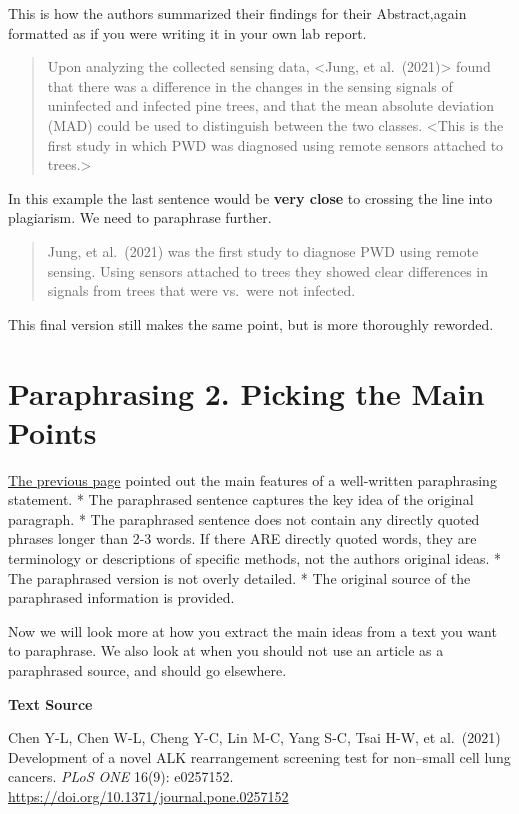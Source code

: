 \documentclass[
]{book}
\begin{document}
This is how the authors summarized their findings for their Abstract,again formatted as if you were writing it in your own lab report.

\begin{quote}
Upon analyzing the collected sensing data, \textless Jung, et al.~(2021)\textgreater{} found that there was a difference in the changes in the sensing signals of uninfected and infected pine trees, and that the mean absolute deviation (MAD) could be used to distinguish between the two classes. \textless This is the first study in which PWD was diagnosed using remote sensors attached to trees.\textgreater{}
\end{quote}

In this example the last sentence would be \textbf{very close} to crossing the line into plagiarism. We need to paraphrase further.

\begin{quote}
Jung, et al.~(2021) was the first study to diagnose PWD using remote sensing. Using sensors attached to trees they showed clear differences in signals from trees that were vs.~were not infected.
\end{quote}

This final version still makes the same point, but is more thoroughly reworded.

\hypertarget{paraphrasingtwo507}{%
\chapter{Paraphrasing 2. Picking the Main Points}\label{paraphrasingtwo507}}

\protect\hyperlink{paraphrasingone506}{The previous page} pointed out the main features of a well-written paraphrasing statement.
* The paraphrased sentence captures the key idea of the original paragraph.
* The paraphrased sentence does not contain any directly quoted phrases longer than 2-3 words. If there ARE directly quoted words, they are terminology or descriptions of specific methods, not the authors original ideas.
* The paraphrased version is not overly detailed.
* The original source of the paraphrased information is provided.

Now we will look more at how you extract the main ideas from a text you want to paraphrase. We also look at when you should not use an article as a paraphrased source, and should go elsewhere.

\textbf{Text Source}

Chen Y-L, Chen W-L, Cheng Y-C, Lin M-C, Yang S-C, Tsai H-W, et al.~(2021) Development of a novel ALK rearrangement screening test for non--small cell lung cancers. \emph{PLoS ONE} 16(9): e0257152. \url{https://doi.org/10.1371/journal.pone.0257152}
\end{document}

